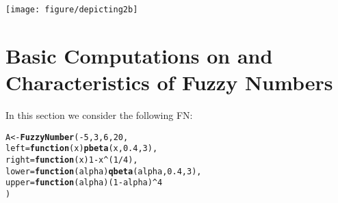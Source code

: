 \documentclass[11pt]{article}\usepackage[]{graphicx}\usepackage[]{color}
\makeatletter
\newcommand{\hlnum}[1]{\textcolor[rgb]{0.686,0.059,0.569}{#1}}%
\newcommand{\hlopt}[1]{\textcolor[rgb]{0,0,0}{#1}}%
\newcommand{\hlstd}[1]{\textcolor[rgb]{0.345,0.345,0.345}{#1}}%
\newcommand{\hlkwa}[1]{\textcolor[rgb]{0.161,0.373,0.58}{\textbf{#1}}}%
\newcommand{\hlkwb}[1]{\textcolor[rgb]{0.69,0.353,0.396}{#1}}%
\newcommand{\hlkwc}[1]{\textcolor[rgb]{0.333,0.667,0.333}{#1}}%
\newcommand{\hlkwd}[1]{\textcolor[rgb]{0.737,0.353,0.396}{\textbf{#1}}}%
\newenvironment{kframe}{%
 \def\at@end@of@kframe{}%
 \ifinner\ifhmode%
  \def\at@end@of@kframe{\end{minipage}}%
  \begin{minipage}{\columnwidth}%
 \fi\fi%
 \def\FrameCommand##1{\hskip\@totalleftmargin \hskip-\fboxsep
 \colorbox{shadecolor}{##1}\hskip-\fboxsep
     \hskip-\linewidth \hskip-\@totalleftmargin \hskip\columnwidth}%
 \MakeFramed {\advance\hsize-\width
   \@totalleftmargin\z@ \linewidth\hsize
   \@setminipage}}%
 {\par\unskip\endMakeFramed%
 \at@end@of@kframe}
\newenvironment{knitrout}{}{} %
\newcommand{\package}[1]{\textsf{#1}\xspace}
\newcommand{\lang}[1]{\textsf{#1}\xspace}
\newcommand{\R}{\lang{R}}
\makeatother
\begin{document}
\begin{center}
\begin{knitrout}\small
{}\color{fgcolor}

{\centering \texttt{[image: figure/depicting2b]} 

}



\end{knitrout}
\end{center}








\section{Basic Computations on and Characteristics of Fuzzy Numbers}


In this section we consider the following FN:

\begin{knitrout}\small
{}\color{fgcolor}\begin{kframe}
\begin{alltt}
\hlstd{A} \hlkwb{<-} \hlkwd{FuzzyNumber}\hlstd{(}\hlopt{-}\hlnum{5}\hlstd{,} \hlnum{3}\hlstd{,} \hlnum{6}\hlstd{,} \hlnum{20}\hlstd{,}
    \hlkwc{left}\hlstd{=}\hlkwa{function}\hlstd{(}\hlkwc{x}\hlstd{)} \hlkwd{pbeta}\hlstd{(x,}\hlnum{0.4}\hlstd{,}\hlnum{3}\hlstd{),}
   \hlkwc{right}\hlstd{=}\hlkwa{function}\hlstd{(}\hlkwc{x}\hlstd{)} \hlnum{1}\hlopt{-}\hlstd{x}\hlopt{^}\hlstd{(}\hlnum{1}\hlopt{/}\hlnum{4}\hlstd{),}
   \hlkwc{lower}\hlstd{=}\hlkwa{function}\hlstd{(}\hlkwc{alpha}\hlstd{)} \hlkwd{qbeta}\hlstd{(alpha,}\hlnum{0.4}\hlstd{,}\hlnum{3}\hlstd{),}
   \hlkwc{upper}\hlstd{=}\hlkwa{function}\hlstd{(}\hlkwc{alpha}\hlstd{) (}\hlnum{1}\hlopt{-}\hlstd{alpha)}\hlopt{^}\hlnum{4}
\hlstd{)}
\end{alltt}
\end{kframe}
\end{knitrout}
\end{document}
